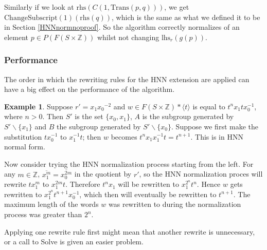 \documentclass[12pt]{article} %
\theoremstyle{definition}
\theoremstyle{definition}
\theoremstyle{definition}
\theoremstyle{definition}
\theoremstyle{definition}
\theoremstyle{definition}
\newtheorem{exmpl}{Example}[theorem]
\begin{document}
Similarly if we look at $\text{rhs}(C(1, \text{Trans}(p, q)))$, we get
$\text{ChangeSubscript}(1)(\text{rhs}(q))$, which is the same as what we defined
it to be in Section \ref{HNNnormnoproof}. So the algorithm correctly normalizes
 of an element $p \in P(F (S \times \mathbb{Z}))$ whilst not changing
$\text{lhs}_r(g(p))$.

\subsubsection{Performance}\label{HNNperf}

The order in which the rewriting rules for the HNN extension
are applied can have a big effect on the performance
of the algorithm.

\begin{exmpl}\label{ltrbad}
Suppose $r' = {x_1}{x_0}^{-2}$ and
$w \in F(S \times \mathbb{Z}) \ast \langle t \rangle$
is equal to $t^n x_1 t x_0^{-1}$, where $n > 0$.
Then $S'$ is the set $\{x_0, x_1\}$,
$A$ is the subgroup generated by $S' \backslash \{x_1\}$ and
$B$ the subgroup generated by $S' \backslash \{x_0\}$.
Suppose we first make the substitution $tx_0^{-1}$ to $x_1^{-1} t$;
then $w$ becomes $t^{n}x_1x_1^{-1}t = t^{n+1}$.
This is in HNN normal form.

Now consider trying the HNN normalization process starting from the left.
For any $m \in \mathbb{Z}$, $\overline{x_1^m} = \overline{x_0^{2m}}$
in the quotient by $r'$,
so the HNN normalization proces will rewrite $tx_1^m$ to $x_1^{2m}t$.
Therefore $t^nx_1$ will be rewritten to $x_1^{2^n}t^n$.
Hence $w$ gets rewritten to $x_1^{2^n} t^{n+1} x_0^{-1}$,
which then will eventually be rewritten to $t^{n+1}$. The maximum length
of the words $w$ was rewritten to during the normalization process was
greater than $2^n$.
\end{exmpl}

Applying one rewrite rule first
might mean that another rewrite is unnecessary, or a call to Solve is
given an easier problem.
\end{document}
